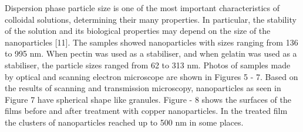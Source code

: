 \begin{multicols}{2}
Dispersion phase particle size is one of the most important
characteristics of colloidal solutions, determining their many
properties. In particular, the stability of the solution and its
biological properties may depend on the size of the nanoparticles
{[}11{]}. The samples showed nanoparticles with sizes ranging from 136
to 995 nm. When pectin was used as a stabiliser, and when gelatin was
used as a stabiliser, the particle sizes ranged from 62 to 313 nm.
Photos of samples made by optical and scanning electron microscope are
shown in Figures 5 - 7. Based on the results of scanning and
transmission microscopy, nanoparticles as seen in Figure 7 have
spherical shape like granules. Figure - 8 shows the surfaces of the
films before and after treatment with copper nanoparticles. In the
treated film the clusters of nanoparticles reached up to 500 nm in some
places.
\end{multicols}

